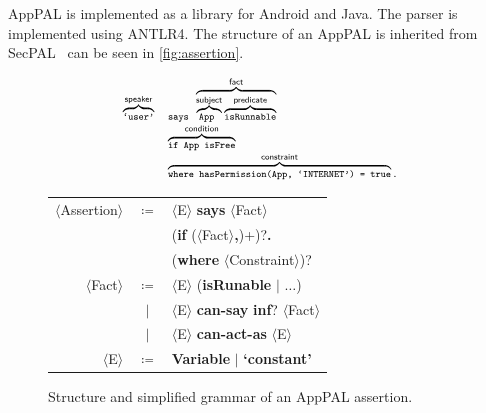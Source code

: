 \documentclass[]{llncs}
\begin{document}
AppPAL is implemented as a library for Android and Java.
The parser is implemented using ANTLR4.
The structure of an AppPAL is inherited from SecPAL~\cite{Becker:2006vh} can be seen in \autoref{fig:assertion}.

\begin{figure}
  \newcommand{\bracetext}[1]{\text{\sffamily #1}}
  \newcommand{\smalltext}[1]{\text{\ttfamily\scriptsize #1}}
  \centering
  \begin{minipage}{0.49\linewidth}
    \begin{equation*}\small
      \begin{array}{r l}\footnotesize
        \overbrace{\smalltext{`user'}}^{\bracetext{speaker}} &
        \smalltext{ says }\overbrace{\overbrace{\smalltext{ App }}^{\bracetext{subject}}\overbrace{\smalltext{ isRunnable}}^{\bracetext{predicate}}}^{\bracetext{fact}} \\
        & \overbrace{\smalltext{ if App isFree}}^{\bracetext{condition}} \\
        & \overbrace{\smalltext{ where hasPermission(App, `INTERNET') = true}}^{\bracetext{constraint}}.
      \end{array}
    \end{equation*}
  \end{minipage}
  \begin{minipage}{0.49\linewidth}
  \newcommand{\nonterminal}[1]{$\langle$#1$\rangle$}
  \newcommand{\terminal}[1]{\textbf{#1}}
  \begin{tabular}{r c l}
    \footnotesize
    \nonterminal{Assertion} & $\coloneqq$ & \nonterminal{E} \terminal{says} \nonterminal{Fact} \\
                            &             & \hspace{1em}(\terminal{if} (\nonterminal{Fact}\terminal{,})+)?\terminal{.} \\
                            &             & \hspace{1em}(\terminal{where} \nonterminal{Constraint})? \\
    \nonterminal{Fact}      & $\coloneqq$ & \nonterminal{E} (\terminal{isRunable} $\vert$ $\ldots$) \\
                            & $\vert$     & \nonterminal{E} \terminal{can-say} \terminal{inf}? \nonterminal{Fact} \\
                            & $\vert$     & \nonterminal{E} \terminal{can-act-as} \nonterminal{E} \\
    \nonterminal{E}         & $\coloneqq$ & \terminal{Variable} $\vert$ \terminal{`constant'}
  \end{tabular}
  \end{minipage}
  \caption{Structure and simplified grammar of an AppPAL assertion.}
  \label{fig:assertion}
\end{figure}
\end{document}
